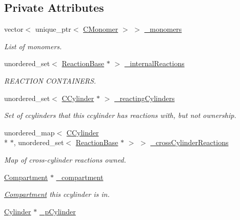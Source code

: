 \subsection*{Private Attributes}
\begin{DoxyCompactItemize}
\item 
vector$<$ unique\+\_\+ptr$<$ \hyperlink{classCMonomer}{C\+Monomer} $>$ $>$ \hyperlink{classCCylinder_a2583ee1b23a42501ece73a2a35d92a31}{\+\_\+monomers}
\begin{DoxyCompactList}\small\item\em List of monomers. \end{DoxyCompactList}\item 
unordered\+\_\+set$<$ \hyperlink{classReactionBase}{Reaction\+Base} $\ast$ $>$ \hyperlink{classCCylinder_a2f377a8697a4b4e053e747287e7a6a09}{\+\_\+internal\+Reactions}
\begin{DoxyCompactList}\small\item\em R\+E\+A\+C\+T\+I\+O\+N C\+O\+N\+T\+A\+I\+N\+E\+R\+S. \end{DoxyCompactList}\item 
unordered\+\_\+set$<$ \hyperlink{classCCylinder}{C\+Cylinder} $\ast$ $>$ \hyperlink{classCCylinder_afdf5de084ef7692b8ee75b078eca384f}{\+\_\+reacting\+Cylinders}
\begin{DoxyCompactList}\small\item\em Set of ccylinders that this ccylinder has reactions with, but not ownership. \end{DoxyCompactList}\item 
unordered\+\_\+map$<$ \hyperlink{classCCylinder}{C\+Cylinder} \\*
$\ast$, unordered\+\_\+set$<$ \hyperlink{classReactionBase}{Reaction\+Base} $\ast$ $>$ $>$ \hyperlink{classCCylinder_a4263400be58cd0e11e0be99a42595c88}{\+\_\+cross\+Cylinder\+Reactions}
\begin{DoxyCompactList}\small\item\em Map of cross-\/cylinder reactions owned. \end{DoxyCompactList}\item 
\hyperlink{classCompartment}{Compartment} $\ast$ \hyperlink{classCCylinder_ad8a1a406025aa82a072215aeb645c8c1}{\+\_\+compartment}
\begin{DoxyCompactList}\small\item\em \hyperlink{classCompartment}{Compartment} this ccylinder is in. \end{DoxyCompactList}\item 
\hyperlink{classCylinder}{Cylinder} $\ast$ \hyperlink{classCCylinder_a4439d9b805e3e206fd495540aa975346}{\+\_\+p\+Cylinder}

\end{DoxyCompactItemize}
